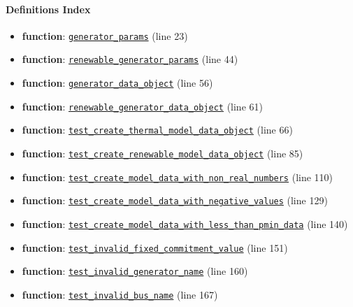 \documentclass[11pt]{report}
\begin{document}
\paragraph{Definitions Index}
\begin{itemize}[leftmargin=*]
  \item \textbf{function}: \hyperref[def:tests-test_model_data.py:generator_params:L23]{\texttt{generator\_params}} (line 23)
  \item \textbf{function}: \hyperref[def:tests-test_model_data.py:renewable_generator_params:L44]{\texttt{renewable\_generator\_params}} (line 44)
  \item \textbf{function}: \hyperref[def:tests-test_model_data.py:generator_data_object:L56]{\texttt{generator\_data\_object}} (line 56)
  \item \textbf{function}: \hyperref[def:tests-test_model_data.py:renewable_generator_data_object:L61]{\texttt{renewable\_generator\_data\_object}} (line 61)
  \item \textbf{function}: \hyperref[def:tests-test_model_data.py:test_create_thermal_model_data_object:L66]{\texttt{test\_create\_thermal\_model\_data\_object}} (line 66)
  \item \textbf{function}: \hyperref[def:tests-test_model_data.py:test_create_renewable_model_data_object:L85]{\texttt{test\_create\_renewable\_model\_data\_object}} (line 85)
  \item \textbf{function}: \hyperref[def:tests-test_model_data.py:test_create_model_data_with_non_real_numbers:L110]{\texttt{test\_create\_model\_data\_with\_non\_real\_numbers}} (line 110)
  \item \textbf{function}: \hyperref[def:tests-test_model_data.py:test_create_model_data_with_negative_values:L129]{\texttt{test\_create\_model\_data\_with\_negative\_values}} (line 129)
  \item \textbf{function}: \hyperref[def:tests-test_model_data.py:test_create_model_data_with_less_than_pmin_data:L140]{\texttt{test\_create\_model\_data\_with\_less\_than\_pmin\_data}} (line 140)
  \item \textbf{function}: \hyperref[def:tests-test_model_data.py:test_invalid_fixed_commitment_value:L151]{\texttt{test\_invalid\_fixed\_commitment\_value}} (line 151)
  \item \textbf{function}: \hyperref[def:tests-test_model_data.py:test_invalid_generator_name:L160]{\texttt{test\_invalid\_generator\_name}} (line 160)
  \item \textbf{function}: \hyperref[def:tests-test_model_data.py:test_invalid_bus_name:L167]{\texttt{test\_invalid\_bus\_name}} (line 167)

\end{itemize}
\end{document}
